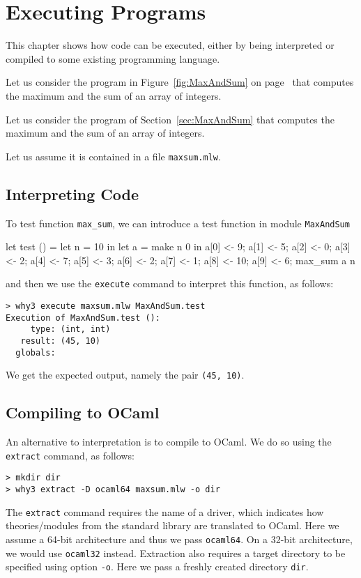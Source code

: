 
\chapter{Executing \whyml Programs}
\label{chap:exec}

This chapter shows how \whyml code can be executed, either by being
interpreted or compiled to some existing programming language.

\begin{latexonly}
Let us consider the program in Figure~\ref{fig:MaxAndSum}
on page~\pageref{fig:MaxAndSum} that computes the maximum and the sum
of an array of integers.
\end{latexonly}
\begin{htmlonly}
Let us consider the program of Section~\ref{sec:MaxAndSum} that computes
the maximum and the sum of an array of integers.
\end{htmlonly}
Let us assume it is contained in a file \texttt{maxsum.mlw}.

\section{Interpreting \whyml Code}
\label{sec:execute}

To test function \texttt{max\_sum}, we can introduce a \whyml test function
in module \texttt{MaxAndSum}
\begin{whycode}
  let test () =
    let n = 10 in
    let a = make n 0 in
    a[0] <- 9; a[1] <- 5; a[2] <- 0; a[3] <- 2;  a[4] <- 7;
    a[5] <- 3; a[6] <- 2; a[7] <- 1; a[8] <- 10; a[9] <- 6;
    max_sum a n
\end{whycode}
and then we use the \texttt{execute} command to interpret this function,
as follows:
\begin{verbatim}
> why3 execute maxsum.mlw MaxAndSum.test
Execution of MaxAndSum.test ():
     type: (int, int)
   result: (45, 10)
  globals:
\end{verbatim}
We get the expected output, namely the pair \texttt{(45, 10)}.

\section{Compiling \whyml to OCaml}
\label{sec:extract}

An alternative to interpretation is to compile \whyml to OCaml.
We do so using the \texttt{extract} command, as follows:
\begin{verbatim}
> mkdir dir
> why3 extract -D ocaml64 maxsum.mlw -o dir
\end{verbatim}
The \texttt{extract} command requires the name of a driver, which indicates
how theories/modules from the \why standard library are translated to
OCaml. Here we assume a 64-bit architecture and thus we pass
\texttt{ocaml64}. On a 32-bit architecture, we would use
\texttt{ocaml32} instead. Extraction also requires a target directory
to be specified using option \verb+-o+. Here we pass a freshly created
directory \texttt{dir}.

